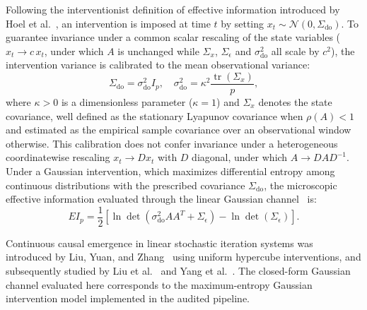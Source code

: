 \documentclass[preprint,12pt]{elsarticle}
\begin{document}
Following the interventionist definition of effective information introduced by Hoel et al.~\cite{Hoel2013,Hoel2017}, an intervention is imposed at time $t$ by setting $x_t \sim \mathcal{N}(0, \Sigma_{\mathrm{do}})$. To guarantee invariance under a common scalar rescaling of the state variables ($x_t \to c\, x_t$, under which $A$ is unchanged while $\Sigma_x$, $\Sigma_\epsilon$ and $\sigma_{\mathrm{do}}^2$ all scale by $c^2$), the intervention variance is calibrated to the mean observational variance:
\begin{equation}
\Sigma_{\mathrm{do}} = \sigma_{\mathrm{do}}^2 I_p, \quad \sigma_{\mathrm{do}}^2 = \kappa^2 \frac{\operatorname{tr}(\Sigma_x)}{p},
\label{eq:scale_invariant_do}
\end{equation}
where $\kappa > 0$ is a dimensionless parameter ($\kappa = 1$) and $\Sigma_x$ denotes the state covariance, well defined as the stationary Lyapunov covariance when $\rho(A) < 1$ and estimated as the empirical sample covariance over an observational window otherwise. This calibration does not confer invariance under a heterogeneous coordinatewise rescaling $x_t \to D x_t$ with $D$ diagonal, under which $A \to D A D^{-1}$. Under a Gaussian intervention, which maximizes differential entropy among continuous distributions with the prescribed covariance $\Sigma_{\mathrm{do}}$, the microscopic effective information evaluated through the linear Gaussian channel~\cite{Hoel2013,Hoel2017} is:
\begin{equation}
EI_p = \frac{1}{2} \left[ \ln\det(\sigma_{\mathrm{do}}^2 A A^T + \Sigma_\epsilon) - \ln\det(\Sigma_\epsilon) \right].
\label{eq:ei_micro}
\end{equation}

Continuous causal emergence in linear stochastic iteration systems was introduced by Liu, Yuan, and Zhang~\cite{Liu2024} using uniform hypercube interventions, and subsequently studied by Liu et al.~\cite{Liu2025} and Yang et al.~\cite{Yang2025}. The closed-form Gaussian channel evaluated here corresponds to the maximum-entropy Gaussian intervention model implemented in the audited pipeline.
\end{document}
